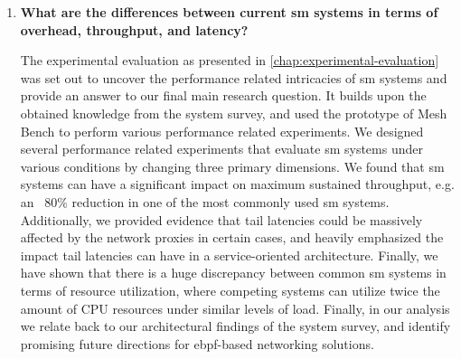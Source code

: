\begin{enumerate}[label=\textbf{RQ\arabic*}, leftmargin=3\parindent]
    \item \textbf{What are the differences between current \gls{sm} systems in terms of overhead, throughput, and latency?}
    \label{rq-3:ans}
    
    The experimental evaluation as presented in \cref{chap:experimental-evaluation} was set out to uncover the performance related intricacies of \gls{sm} systems and provide an answer to our final main research question. It builds upon the obtained knowledge from the system survey, and used the prototype of Mesh Bench to perform various performance related experiments. We designed several performance related experiments that evaluate \gls{sm} systems under various conditions by changing three primary dimensions. We found that \gls{sm} systems can have a significant impact on maximum sustained throughput, e.g. an ~80\% reduction in one of the most commonly used \gls{sm} systems. Additionally, we provided evidence that tail latencies could be massively affected by the network proxies in certain cases, and heavily emphasized the impact tail latencies can have in a service-oriented architecture. Finally, we have shown that there is a huge discrepancy between common \gls{sm} systems in terms of resource utilization, where competing systems can utilize twice the amount of CPU resources under similar levels of load. Finally, in our analysis we relate back to our architectural findings of the system survey, and identify promising future directions for \gls{ebpf}-based networking solutions.

\end{enumerate}